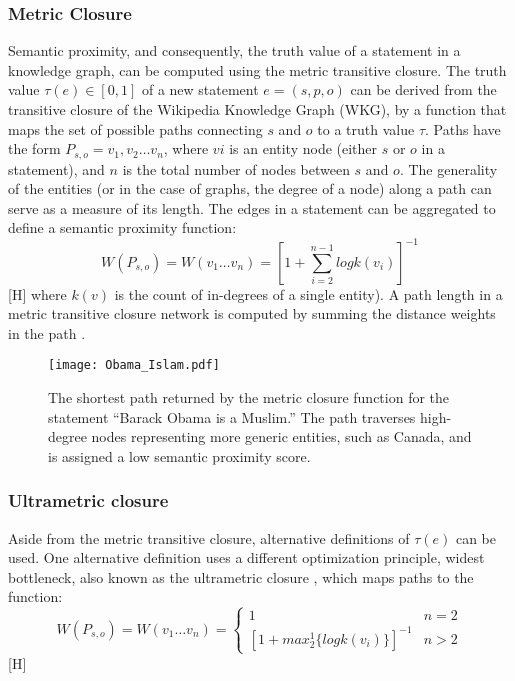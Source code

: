 \documentclass[10pt,11pt,12pt,oneside]{book}
\begin{document}
	\subsubsection{Metric Closure}
	Semantic proximity, and consequently, the truth value of a statement in a knowledge graph, can be computed using the metric transitive closure. The truth value $\tau(e) \in [0, 1]$ of a new statement $e = (s, p, o)$ can be derived from the transitive closure of the Wikipedia Knowledge Graph (WKG), by a function that maps the set of possible paths connecting $s$ and $o$ to a truth value $\tau$. Paths have the form $P_{s,o} = v_{1}, v_{2}\ldots v_{n}$, where $vi$  is an entity node (either $s$ or $o$ in a statement), and $n$ is the total number of nodes between $s$ and $o$. The generality of the entities (or in the case of graphs, the degree of a node) along a path can serve as a measure of its length. The edges in a statement can be aggregated to define a semantic proximity function:
	$$
	W(P_{s,o}) = W(v_{1}\ldots v_{n}) = {[1 +  \sum_{i=2}^{n-1} log k(v_{i})]}^{-1}
	$$[H]
	where $k(v)$ is the count of in-degrees of a single entity). A path length in a metric transitive closure network is computed by summing the distance weights in the path \cite{SIMAS2015}.
	
	\begin{figure}[H]
		\begin{center}
			\texttt{[image: Obama\_Islam.pdf]}\\
			\label{fig_tc_obama}
			\caption{The shortest path returned by the metric closure function for the statement “Barack Obama is a Muslim.” The path traverses high-degree nodes representing more generic entities, such as Canada, and is assigned a low semantic proximity score. }
		\end{center}
	\end{figure}
	
	\subsubsection{Ultrametric closure}
	Aside from the metric transitive closure, alternative definitions of $\tau(e)$ can be used. One alternative definition uses a different optimization principle, widest bottleneck, also known as the ultrametric closure \cite{gruber1993translation}, which maps paths to the function:
	$$
	W(P_{s,o}) = W(v_{1}\ldots v_{n}) =\begin{cases}1 & n=2\\{[1+max^1_2 \{log k(v_{i})\}]^{-1}} & n>2\end{cases} 
	$$[H]
	
\end{document}
